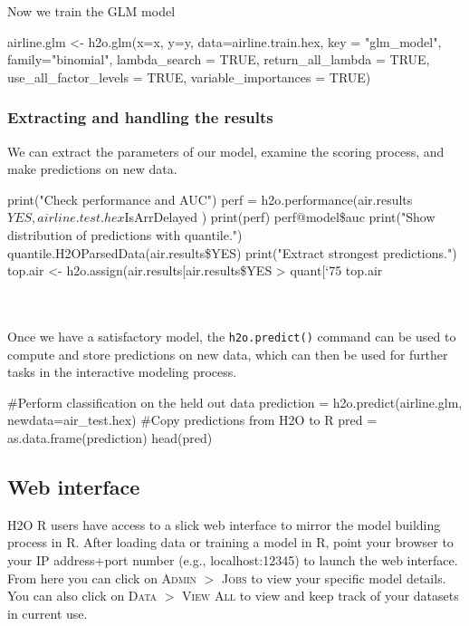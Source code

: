 \documentclass[11pt]{article}
\begin{document}
Now we train the GLM model

\begin{spverbatim}
airline.glm <- h2o.glm(x=x, 
                     y=y, 
                     data=airline.train.hex,
                     key = "glm_model",
                     family="binomial",
                     lambda_search = TRUE,
                     return_all_lambda = TRUE,
                     use_all_factor_levels = TRUE,
                     variable_importances = TRUE)
\end{spverbatim}

\subsubsection{Extracting and handling the results} \label{3.2.1}

We can extract the parameters of our model, examine the scoring process, and make predictions on new data.

\begin{spverbatim}
print("Check performance and AUC")
perf = h2o.performance(air.results$YES,airline.test.hex$IsArrDelayed )
print(perf)
perf@model\$auc
print("Show distribution of predictions with quantile.")
quantile.H2OParsedData(air.results\$YES)  
print("Extract strongest predictions.")
top.air <- h2o.assign(air.results[air.results\$YES > quant[‘75%
top.air
\end{spverbatim}
\noindent
\\
\\
Once we have a satisfactory model, the \texttt{h2o.predict()} command can be used to compute and store predictions on new data, which can then be used for further tasks in the interactive modeling process.
\begin{spverbatim}
#Perform classification on the held out data
prediction = h2o.predict(airline.glm, newdata=air_test.hex)
#Copy predictions from H2O to R
pred = as.data.frame(prediction)
head(pred)
\end{spverbatim}
\subsection{Web interface} \label{3.3}
H2O R users have access to a slick web interface to mirror the model building process in R. After loading data or training a model in R, point your browser to your IP address+port number (e.g., localhost:12345) to launch the web interface. From here you can click on \textsc{Admin} $>$ \textsc{Jobs} to view your specific model details. You can also click on \textsc{Data} $>$ \textsc{View All} to view and keep track of your datasets in current use. 
\end{document}
